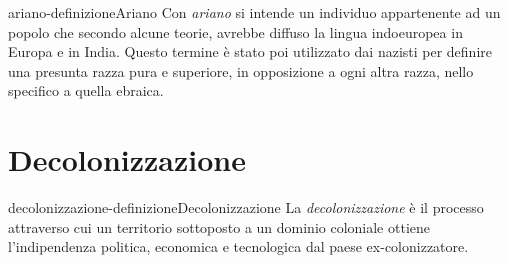 \documentclass[preview]{standalone}
\begin{document}
\begin{snippetdefinition}{ariano-definizione}{Ariano}
    Con \textit{ariano} si intende un individuo appartenente ad un popolo
    che secondo alcune teorie, avrebbe diffuso la lingua indoeuropea in Europa
    e in India. Questo termine è stato poi utilizzato dai nazisti per definire
    una presunta razza pura e superiore, in opposizione a ogni altra razza,
    nello specifico a quella ebraica.
\end{snippetdefinition}

\section{Decolonizzazione}

\begin{snippetdefinition}{decolonizzazione-definizione}{Decolonizzazione}
    La \textit{decolonizzazione} è il processo attraverso cui
    un territorio sottoposto a un dominio coloniale ottiene l'indipendenza
    politica, economica e tecnologica dal paese ex-colonizzatore.
\end{snippetdefinition}
\end{document}
